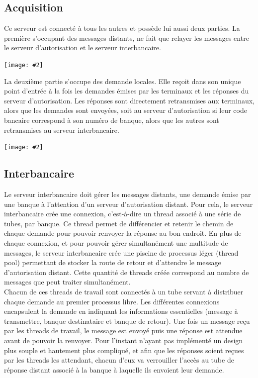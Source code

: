 \documentclass[french, a4paper, 12pt, titlepage]{article}
\newcommand{\graph}[2]{
\medskip
	\begin{center}
		\texttt{[image: \#2]}
	\end{center}
\medskip
}
\begin{document}
\subsection{Acquisition}
Ce serveur est connecté à tous les autres et possède lui aussi deux parties.
La première s'occupant des messages distants, ne fait que relayer les messages entre le serveur d'autorisation et le serveur interbancaire.
\graph{0.5}{acquisitionStateRemote}
La deuxième partie s'occupe des demande locales. Elle reçoit dans son unique point d'entrée à la fois les demandes émises par les terminaux et les réponses du serveur d'autorisation.
Les réponses sont directement retransmises aux terminaux, alors que les demandes sont envoyées, soit au serveur d'autorisation si leur code bancaire correspond à son numéro de banque, alors que les autres sont retransmises au serveur interbancaire.
\graph{0.4}{acquisitionStateLocal}

\subsection{Interbancaire}
Le serveur interbancaire doit gérer les messages distants, une demande émise par une banque à l'attention d'un serveur d'autorisation distant.
Pour cela, le serveur interbancaire crée une \og connexion\fg{}, c'est-à-dire un thread associé à une série de tubes, par banque.
Ce thread permet de différencier et retenir le chemin de chaque demande pour pouvoir renvoyer la réponse au bon endroit.
En plus de chaque connexion, et pour pouvoir gérer simultanément une multitude de messages, le serveur interbancaire crée une piscine de processus léger (thread pool)
permettant de stocker la route de retour et d'attendre le message d'autorisation distant.
Cette quantité de threads créée correspond au nombre de messages que peut traiter simultanément. \\

Chacun de ces threads de travail sont connectés à un tube servant à distribuer chaque demande au premier processus libre.
Les différentes connexions encapsulent la demande en indiquant les informations essentielles (message à transmettre, banque destinataire et banque de retour).
Une fois un message reçu par les threads de travail, le message est envoyé puis une réponse est attendue avant de pouvoir la renvoyer.
Pour l'instant n'ayant pas implémenté un design plus souple et hautement plus compliqué, et afin que les réponses soient reçues par les threads les attendant, chacun d'eux va verrouiller l'accès au tube de réponse distant associé à la banque à laquelle ils envoient leur demande.
\end{document}
